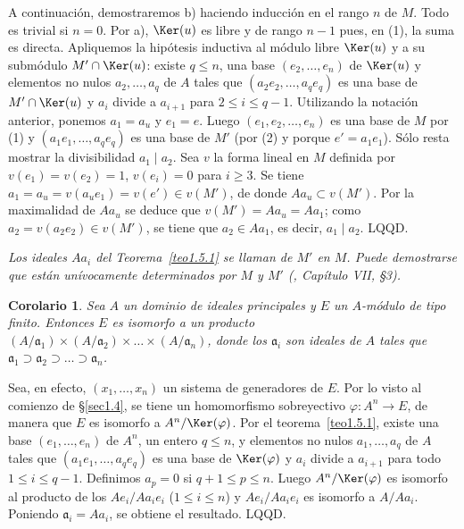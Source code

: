 \documentclass[bibtotoc,leqno,spanish]{amsbook}
\let\emph\relax %
\newcommand{\idl}[1]{\mathfrak{#1}}
\newcommand{\QED}{LQQD.}
\renewcommand{\to}[1][]{\xrightarrow{#1}}
\numberwithin{equation}{section}
\newenvironment{comm}%
	{\begin{list}{}{\setlength{\leftmargin}{2\parindent}\setlength{\topsep}{\baselineskip}}\item\itshape}
	{\end{list}}
\theoremstyle{note}
\theoremstyle{note}
\newtheorem{corollary}{Corolario}
\theoremstyle{rem}
\numberwithin{theorem}{section}
\numberwithin{proposition}{section}
\numberwithin{definition}{section}
\numberwithin{lemma}{section}
\numberwithin{corollary}{section}
\numberwithin{example}{section}
\numberwithin{footnote}{section}%
\begin{document}
A continuaci\'on, demostraremos b) haciendo inducci\'on en el rango $n$ de $M$. Todo es trivial
si $n = 0$. Por a), $\Ker(u)$ es libre y de rango $n-1$ pues, en (1), la suma es directa. Apliquemos
la hip\'otesis inductiva al m\'odulo libre $\Ker(u)$ y a su subm\'odulo $M'\cap\Ker(u)$:
existe $q\leq n$, una base $(e_{2},\dots,e_{n})$ de $\Ker(u)$ y elementos no nulos
$a_{2},\dots,a_{q}$ de $A$ tales que $(a_{2}e_{2},\dots,a_{q}e_{q})$ es una base de
$M'\cap\Ker(u)$ y $a_{i}$ divide a $a_{i+1}$ para $2\leq i\leq q-1$. Utilizando la notaci\'on
anterior, ponemos $a_{1} = a_{u}$ y $e_{1} = e$. Luego $(e_{1},e_{2},\dots,e_{n})$ es una base
de $M$ por (1) y $(a_{1}e_{1},\dots,a_{q}e_{q})$ es una base de $M'$ (por (2) y porque
$e' = a_{1}e_{1}$). S\'olo resta mostrar la divisibilidad $a_{1}\mid a_{2}$. Sea $v$ la
forma lineal en $M$ definida por $v(e_{1}) = v(e_{2}) = 1$, $v(e_{i}) = 0$ para $i\geq 3$.
Se tiene $a_{1} = a_{u} = v(a_{u}e_{1}) = v(e')\in v(M')$, de donde $Aa_{u}\subset v(M')$.
Por la maximalidad de $Aa_{u}$ se deduce que $v(M') = Aa_{u} = Aa_{1}$; como $a_{2} = v(a_{2}e_{2})
\in v(M')$, se tiene que $a_{2}\in Aa_{1}$, es decir, $a_{1}\mid a_{2}$. \QED

\begin{comm}
Los ideales $Aa_{i}$ del Teorema~\ref{teo1.5.1} se llaman \emph{factores
invariantes} de $M'$ en $M$. Puede demostrarse que est\'an un\'ivocamente determinados
por $M$ y $M'$ (\cite{Bourbaki1}, Cap\'itulo VII, \S3).
\end{comm}

\begin{corollary}\label{cor1.5.1}
Sea $A$ un dominio de ideales principales y $E$ un $A$-m\'odulo
de tipo finito. Entonces $E$ es isomorfo a un producto
$(A/\idl{a}_{1})\times(A/\idl{a}_{2})\times\dots\times
(A/\idl{a}_{n})$, donde los $\idl{a}_{i}$ son ideales de $A$
tales que $\idl{a}_{1}\supset\idl{a}_{2}\supset\dots\supset
\idl{a}_{n}$.
\end{corollary}

Sea, en efecto, $(x_{1},\dots,x_{n})$ un sistema de generadores de $E$. Por lo visto
al comienzo de \S\ref{sec1.4}, se tiene un homomorfismo sobreyectivo $\varphi:A^{n}\to E$, de manera
que $E$ es isomorfo a $A^{n}/\Ker(\varphi)$. Por el teorema~\ref{teo1.5.1},
existe una base $(e_{1},\dots,e_{n})$
de $A^{n}$, un entero $q\leq n$, y elementos no nulos $a_{1},\dots,a_{q}$ de $A$ tales que
$(a_{1}e_{1},\dots,a_{q}e_{q})$ es una base de $\Ker(\varphi)$ y $a_{i}$ divide a $a_{i+1}$ para
todo $1\leq i\leq q-1$. Definimos $a_{p} = 0$ si $q+1\leq p\leq n$. Luego $A^{n}/\Ker(\varphi)$
es isomorfo al producto de los $Ae_{i}/Aa_{i}e_{i}$ ($1\leq i\leq n$) y $Ae_{i}/Aa_{i}e_{i}$
es isomorfo a $A/Aa_{i}$. Poniendo $\idl{a}_{i} = Aa_{i}$, se obtiene el resultado. \QED
\end{document}
